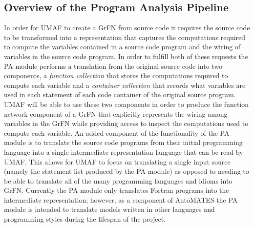 \subsection{Overview of the Program Analysis Pipeline\label{sec:pa_overview}}
In order for UMAF to create a GrFN from source code it requires the source code to be transformed into a representation that captures the computations required to compute the variables contained in a source code program and the wiring of variables in the source code program.
In order to fulfill both of these requests the PA module performs a translation from the original source code into two components, a \textit{function collection} that stores the computations required to compute each variable and a \textit{container collection} that records what variables are used in each statement of each code container of the original source program.
UMAF will be able to use these two components in order to produce the function network component of a GrFN that explicitly represents the wiring among variables in the GrFN while providing access to inspect the computations used to compute each variable.
An added component of the functionality of the PA module is to translate the source code programs from their initial programming language into a single intermediate representation language that can be read by UMAF.
This allows for UMAF to focus on translating a single input source (namely the statement list produced by the PA module) as opposed to needing to be able to translate all of the many programming languages and idioms into GrFN.
Currently the PA module only translates Fortran programs into the intermediate representation; however, as a component of AutoMATES the PA module is intended to translate models written in other languages and programming styles during the lifespan of the project.

